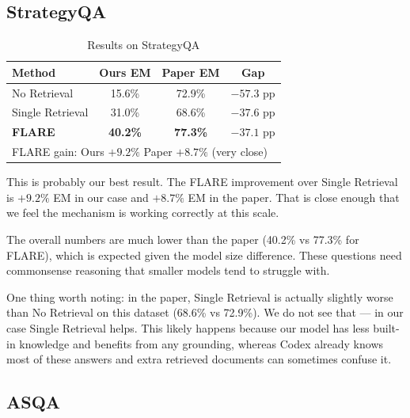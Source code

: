 \documentclass[conference]{IEEEtran}
\begin{document}
\subsection{StrategyQA}

\begin{table}[htbp]
\caption{Results on StrategyQA}
\label{tab:stratqa}
\centering
\begin{tabular}{lccc}
\toprule
\textbf{Method} & \textbf{Ours EM} & \textbf{Paper EM} & \textbf{Gap} \\
\midrule
No Retrieval     & 15.6\% & 72.9\% & $-57.3$ pp \\
Single Retrieval & 31.0\% & 68.6\% & $-37.6$ pp \\
\textbf{FLARE}   & \textbf{40.2\%} & \textbf{77.3\%} & $-37.1$ pp \\
\midrule
\multicolumn{4}{l}{\small FLARE gain: Ours $+9.2\%$ \quad Paper $+8.7\%$ (very close)} \\
\bottomrule
\end{tabular}
\end{table}

This is probably our best result. The FLARE improvement over Single
Retrieval is $+9.2\%$ EM in our case and $+8.7\%$ EM in the paper.
That is close enough that we feel the mechanism is working correctly
at this scale.

The overall numbers are much lower than the paper (40.2\% vs 77.3\%
for FLARE), which is expected given the model size difference. These
questions need commonsense reasoning that smaller models tend to
struggle with.

One thing worth noting: in the paper, Single Retrieval is actually
slightly worse than No Retrieval on this dataset (68.6\% vs 72.9\%).
We do not see that — in our case Single Retrieval helps. This likely
happens because our model has less built-in knowledge and benefits
from any grounding, whereas Codex already knows most of these
answers and extra retrieved documents can sometimes confuse it.

\subsection{ASQA}
\end{document}
